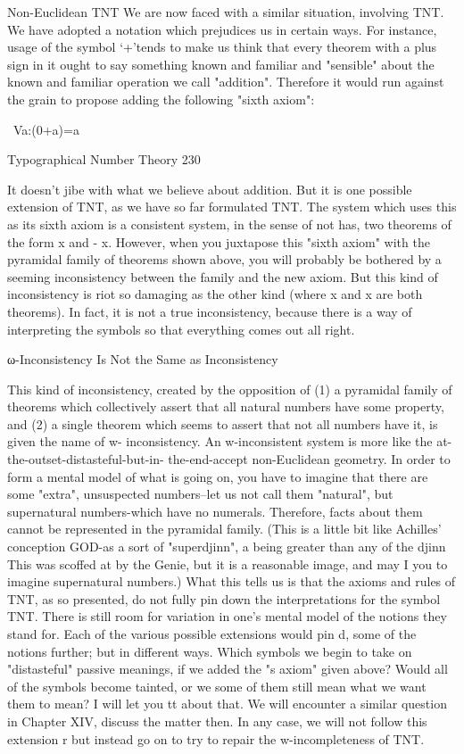                                 Non-Euclidean TNT
We are now faced with a similar situation, involving TNT. We have adopted a notation
which prejudices us in certain ways. For instance, usage of the symbol `+'tends to make
us think that every theorem with a plus sign in it ought to say something known and
familiar and "sensible" about the known and familiar operation we call "addition".
Therefore it would run against the grain to propose adding the following "sixth axiom":

                                      ~Va:(0+a)=a




Typographical Number Theory                                                           230

It doesn't jibe with what we believe about addition. But it is one possible extension of
TNT, as we have so far formulated TNT. The system which uses this as its sixth axiom is
a consistent system, in the sense of not has, two theorems of the form x and - x. However,
when you juxtapose this "sixth axiom" with the pyramidal family of theorems shown
above, you will probably be bothered by a seeming inconsistency between the family and
the new axiom. But this kind of inconsistency is riot so damaging as the other kind
(where x and x are both theorems). In fact, it is not a true inconsistency, because there is
a way of interpreting the symbols so that everything comes out all right.

                   ω-Inconsistency Is Not the Same as Inconsistency

This kind of inconsistency, created by the opposition of (1) a pyramidal family of
theorems which collectively assert that all natural numbers have some property, and (2) a
single theorem which seems to assert that not all numbers have it, is given the name of w-
inconsistency. An w-inconsistent system is more like the at-the-outset-distasteful-but-in-
the-end-accept non-Euclidean geometry. In order to form a mental model of what is
going on, you have to imagine that there are some "extra", unsuspected numbers--let us
not call them "natural", but supernatural numbers-which have no numerals. Therefore,
facts about them cannot be represented in the pyramidal family. (This is a little bit like
Achilles' conception GOD-as a sort of "superdjinn", a being greater than any of the djinn
This was scoffed at by the Genie, but it is a reasonable image, and may I you to imagine
supernatural numbers.)
         What this tells us is that the axioms and rules of TNT, as so presented, do not
fully pin down the interpretations for the symbol TNT. There is still room for variation in
one's mental model of the notions they stand for. Each of the various possible extensions
would pin d, some of the notions further; but in different ways. Which symbols we begin
to take on "distasteful" passive meanings, if we added the "s axiom" given above? Would
all of the symbols become tainted, or we some of them still mean what we want them to
mean? I will let you tt about that. We will encounter a similar question in Chapter XIV,
discuss the matter then. In any case, we will not follow this extension r but instead go on
to try to repair the w-incompleteness of TNT.

